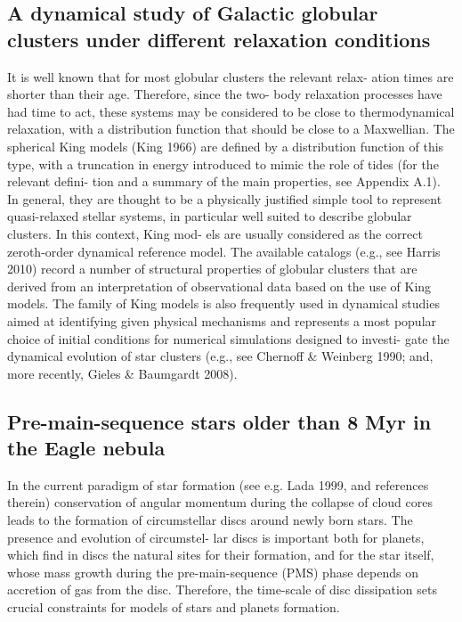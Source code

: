 \documentclass[../main.tex]{subfiles}
\begin{document}
{\subsection{A dynamical study of Galactic globular clusters
	under different relaxation conditions}
It is well known that for most globular clusters the relevant relax-
ation times are shorter than their age. Therefore, since the two-
body relaxation processes have had time to act, these systems
may be considered to be close to thermodynamical relaxation,
with a distribution function that should be close to a Maxwellian.
The spherical King models (King 1966) are defined by a
distribution function of this type, with a truncation in energy
introduced to mimic the role of tides (for the relevant defini-
tion and a summary of the main properties, see Appendix A.1).
In general, they are thought to be a physically justified simple
tool to represent quasi-relaxed stellar systems, in particular well
suited to describe globular clusters. In this context, King mod-
els are usually considered as the correct zeroth-order dynamical
reference model. The available catalogs (e.g., see Harris 2010)
record a number of structural properties of globular clusters that
are derived from an interpretation of observational data based
on the use of King models. The family of King models is also
frequently used in dynamical studies aimed at identifying given
physical mechanisms and represents a most popular choice of
initial conditions for numerical simulations designed to investi-
gate the dynamical evolution of star clusters (e.g., see Chernoﬀ
& Weinberg 1990; and, more recently, Gieles & Baumgardt
2008).
\subsection{Pre-main-sequence stars older than 8 Myr in the Eagle nebula}
In the current paradigm of star formation (see e.g. Lada 1999, and
references therein) conservation of angular momentum during the
collapse of cloud cores leads to the formation of circumstellar discs
around newly born stars. The presence and evolution of circumstel-
lar discs is important both for planets, which find in discs the natural
sites for their formation, and for the star itself, whose mass growth
during the pre-main-sequence (PMS) phase depends on accretion
of gas from the disc. Therefore, the time-scale of disc dissipation
sets crucial constraints for models of stars and planets formation.

}
\end{document}
